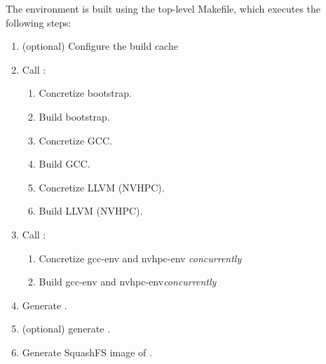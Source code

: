 The environment is built using the top-level Makefile, which executes the following steps:
\begin{enumerate}
    \item (optional) Configure the build cache
    \item Call :
    \begin{enumerate}
        \item Concretize bootstrap.
        \item Build bootstrap.
        \item Concretize GCC.
        \item Build GCC.
        \item Concretize LLVM (NVHPC).
        \item Build LLVM (NVHPC).
    \end{enumerate}
    \item Call :
    \begin{enumerate}
        \item Concretize gcc-env and nvhpc-env \emph{concurrently}
        \item Build gcc-env and nvhpc-env\emph{concurrently}
    \end{enumerate}
    \item Generate .
    \item (optional) generate .
    \item Generate SquashFS image of .
\end{enumerate}

